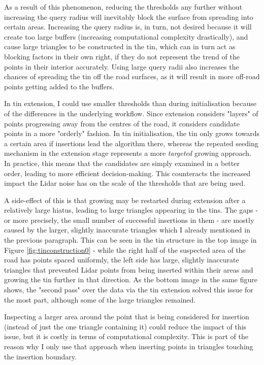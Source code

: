 As a result of this phenomenon, reducing the thresholds any further without increasing the query radius will inevitably block the surface from spreading into certain areas. Increasing the query radius is, in turn, not desired because it will create too large buffers (increasing computational complexity drastically), and cause large triangles to be constructed in the \ac{tin}, which can in turn act as blocking factors in their own right, if they do not represent the trend of the points in their interior accurately. Using large query radii also increases the chances of spreading the \ac{tin} off the road surfaces, as it will result in more off-road points getting added to the buffers.

In \ac{tin} extension, I could use smaller thresholds than during initialisation because of the differences in the underlying workflow. Since extension considers "layers" of points progressing away from the centres of the road, it considers candidate points in a more "orderly" fashion. In \ac{tin} initialisation, the \ac{tin} only grows towards a certain area if insertions lead the algorithm there, whereas the repeated seeding mechanism in the extension stage represents a more \textit{targeted} growing approach. In practice, this means that the candidates are simply examined in a better order, leading to more efficient decision-making. This counteracts the increased impact the Lidar noise has on the scale of the thresholds that are being used.

A side-effect of this is that growing may be restarted during extension after a relatively large hiatus, leading to large triangles appearing in the \ac{tin}s. The gaps - or more precisely, the small number of successful insertions in them - are mostly caused by the larger, slightly inaccurate triangles which I already mentioned in the previous paragraph. This can be seen in the \ac{tin} structure in the top image in Figure \ref{fig:tinconstruction0} - while the right half of the suspected area of the road has points spaced uniformly, the left side has large, slightly inaccurate triangles that prevented Lidar points from being inserted within their areas and growing the \ac{tin} further in that direction. As the bottom image in the same figure shows, the "second pass" over the data via the \ac{tin} extension solved this issue for the most part, although some of the large triangles remained.

Inspecting a larger area around the point that is being considered for insertion (instead of just the one triangle containing it) could reduce the impact of this issue, but it is costly in terms of computational complexity. This is part of the reason why I only use that approach when inserting points in triangles touching the insertion boundary.

